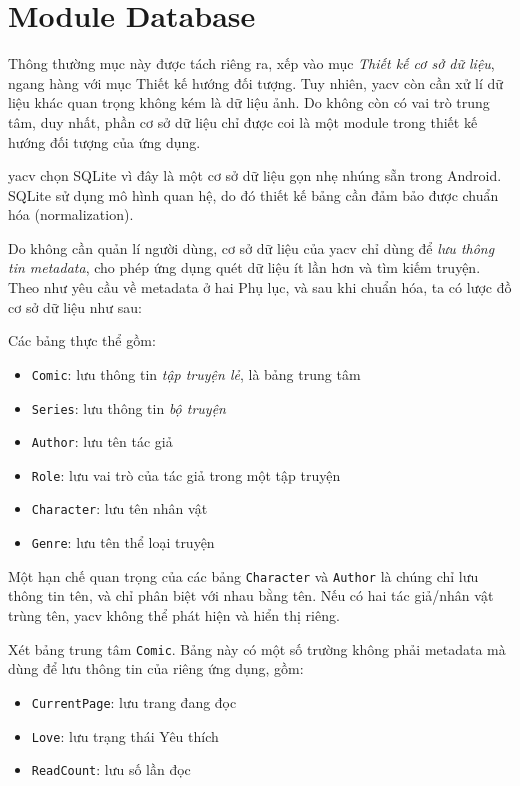 \documentclass[../../../../thesis]{subfiles}
\begin{document}
\section{Module Database}\label{sec:module-database}

Thông thường mục này được tách riêng ra, xếp vào mục \emph{Thiết kế cơ sở dữ
liệu}, ngang hàng với mục Thiết kế hướng đối tượng. Tuy nhiên, yacv còn cần xử
lí dữ liệu khác quan trọng không kém là dữ liệu ảnh. Do không còn có vai trò
trung tâm, duy nhất, phần cơ sở dữ liệu chỉ được coi là một module trong thiết
kế hướng đối tượng của ứng dụng.

yacv chọn SQLite vì đây là một cơ sở dữ liệu gọn nhẹ nhúng sẵn trong Android.
SQLite sử dụng mô hình quan hệ, do đó thiết kế bảng cần đảm bảo được chuẩn hóa
(normalization).

Do không cần quản lí người dùng, cơ sở dữ liệu của yacv chỉ dùng để \emph{lưu
thông tin metadata}, cho phép ứng dụng quét dữ liệu ít lần hơn và tìm kiếm
truyện. Theo như yêu cầu về metadata ở hai Phụ lục, và sau khi chuẩn hóa, ta có
lược đồ cơ sở dữ liệu như sau:

Các bảng thực thể gồm:

\begin{itemize}
    \item
          \texttt{Comic}: lưu thông tin \emph{tập truyện lẻ}, là bảng trung tâm
    \item
          \texttt{Series}: lưu thông tin \emph{bộ truyện}
    \item
          \texttt{Author}: lưu tên tác giả
    \item
          \texttt{Role}: lưu vai trò của tác giả trong một tập truyện
    \item
          \texttt{Character}: lưu tên nhân vật
    \item
          \texttt{Genre}: lưu tên thể loại truyện
\end{itemize}

Một hạn chế quan trọng của các bảng \texttt{Character} và \texttt{Author} là
chúng chỉ lưu thông tin tên, và chỉ phân biệt với nhau bằng tên. Nếu có hai tác
giả/nhân vật trùng tên, yacv không thể phát hiện và hiển thị riêng.

Xét bảng trung tâm \texttt{Comic}. Bảng này có một số trường không phải metadata
mà dùng để lưu thông tin của riêng ứng dụng, gồm:

\begin{itemize}
    \item
          \texttt{CurrentPage}: lưu trang đang đọc
    \item
          \texttt{Love}: lưu trạng thái Yêu thích
    \item
          \texttt{ReadCount}: lưu số lần đọc
\end{itemize}
\end{document}
